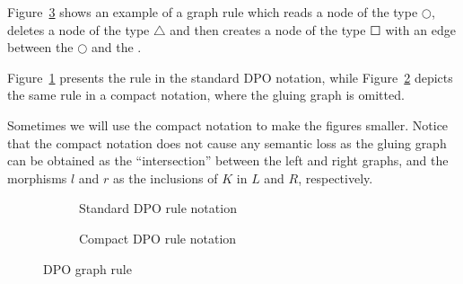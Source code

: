 \begin{example} Figure~\ref{fig:gts:rule} shows an example of a graph rule which reads a node of the type $\Circle$, deletes a node of the type $\triangle$ and then creates a node of the type $\Square$ with an edge between the $\Circle$ and the \Square. 
  
Figure~\ref{fig:gts:rule-standard} presents the rule in the standard DPO notation, while Figure~\ref{fig:gts:rule-compact} depicts the same rule in a compact notation, where the gluing graph is omitted. 

Sometimes we will use the compact notation to make the figures smaller. Notice that the compact notation does not cause any semantic loss as the gluing graph can be obtained as the ``intersection'' between the left and right graphs, and the morphisms $l$ and $r$ as the inclusions of $K$ in $L$ and $R$, respectively.

\begin{figure}[!ht]
  \centering
  \begin{subfigure}[t]{.5\textwidth}
    \centerline{}
    \caption{Standard DPO rule notation}\label{fig:gts:rule-standard}
  \end{subfigure}

  \begin{subfigure}[t]{.5\textwidth}
    \centerline{}
    \caption{Compact DPO rule notation}\label{fig:gts:rule-compact}
  \end{subfigure}
  \caption{DPO graph rule}\label{fig:gts:rule}
\end{figure}
\end{example}


